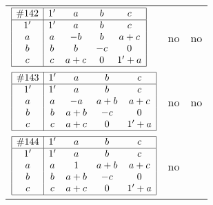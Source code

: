 \documentclass[12pt]{article}
\newcommand{\join}{\mathbin{+}}%
\newcommand{\id}{{1'}}%
\renewcommand{\top}{1}%
\begin{document}
\begin{center}
\begin{longtable}{l|c|c}
$
\begin{array}{|c|cccc|} \hline
\#142 & \id & a & b & c \\ \hline
\id & \id & a & b & c \\
a & a & -b & b & a \join c \\
b & b & b & -c & 0 \\
c & c & a \join c & 0 & \id \join a \\ \hline
\end{array}
$
 & no  
 & no      \\[15mm]

$
\begin{array}{|c|cccc|} \hline
\#143 & \id & a & b & c \\ \hline
\id & \id & a & b & c \\
a & a & -a & a \join b & a \join c \\
b & b & a \join b & -c & 0 \\
c & c & a \join c & 0 & \id \join a \\ \hline
\end{array}
$
 & no  
 & no      \\[15mm]

$
\begin{array}{|c|cccc|} \hline
\#144 & \id & a & b & c \\ \hline
\id & \id & a & b & c \\
a & a & \top & a \join b & a \join c \\
b & b & a \join b & -c & 0 \\
c & c & a \join c & 0 & \id \join a \\ \hline
\end{array}
$
 & no  
 & \adjustbox{valign=c, max height=1.6cm}{$
\left[ \begin{array}{ccccccc}
\id & a & a & b & a & a & b \\ 
a & \id & a & a & c & a & a \\ 
a & a & \id & b & a & a & b \\ 
b & a & b & \id & a & a & b \\ 
a & c & a & a & \id & c & a \\ 
a & a & a & a & c & \id & a \\ 
b & a & b & b & a & a & \id
\end{array}\right]
$}      \\[15mm]


\end{longtable}
\end{center}
\end{document}
